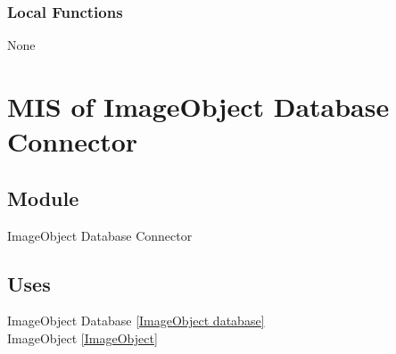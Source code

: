 \documentclass[12pt, titlepage]{article}
\begin{document}
  
  
  \subsubsection{Local Functions}

  None
  

\newpage


\section{MIS of ImageObject Database Connector}\label{ImageObject database connector}
  
  
  
  \subsection{Module}
  
  ImageObject Database Connector

  
  \subsection{Uses}
  
  ImageObject Database \ref{ImageObject database}\\
  ImageObject \ref{ImageObject}\\ 
\end{document}
